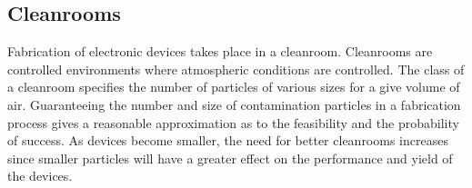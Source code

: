\subsection{Cleanrooms}
\label{sec:fab:cleanrooms}

%
%
%
%

Fabrication of electronic devices takes place in a cleanroom. Cleanrooms are controlled environments where atmospheric conditions are controlled. The class of a cleanroom specifies the number of particles of various sizes for a give volume of air. Guaranteeing the number and size of contamination particles in a fabrication process gives a reasonable approximation as to the feasibility and the probability of success. As devices become smaller, the need for better cleanrooms increases since smaller particles will have a greater effect on the performance and yield of the devices.
